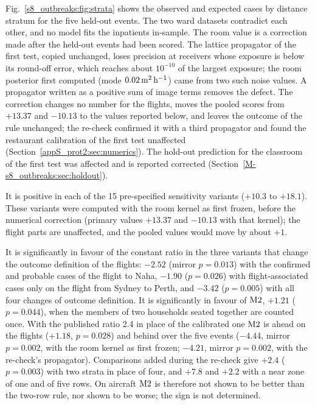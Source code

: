 Fig.~\ref{s8_outbreaks:fig:strata} shows the observed and expected cases by distance stratum for the five
held-out events. The two ward datasets contradict each other, and no model fits the inpatients in-sample.
The room value is a correction made after the held-out events had been scored. The lattice propagator of the
first test, copied unchanged, loses precision at receivers whose exposure is below its round-off error,
which reaches about $10^{-10}$ of the largest exposure; the room posterior first computed (mode $0.02\,\mathrm{m}^2\,\mathrm{h}^{-1}$) came from two such noise values. A
propagator written as a positive sum of image terms removes the defect. The correction changes no number for
the flights, moves the pooled scores from $+13.37$ and $-10.13$ to the values reported below, and leaves the
outcome of the rule unchanged; the re-check confirmed it with a third propagator and found the
restaurant calibration of the first test unaffected (Section~\ref{appS_prot2:sec:numerics}). The hold-out
prediction for the classroom of the first test was affected and is reported corrected
(Section~\ref{M-s8_outbreaks:sec:holdout}).

It is positive in each of the 15 pre-specified
sensitivity variants ($+10.3$ to $+18.1$). These variants were computed with the room kernel as first frozen,
before the numerical correction (primary values $+13.37$ and $-10.13$ with that kernel); the flight parts are
unaffected, and the pooled values would move by about $+1$.

It is significantly in favour of the constant
ratio in the three variants that change the outcome definition of the flights: $-2.52$ (mirror $p=0.013$) with
the confirmed and probable cases of the flight to Naha, $-1.90$ ($p=0.026$) with flight-associated cases only on
the flight from Sydney to Perth, and $-3.42$ ($p=0.005$) with all four changes of outcome definition. It is
significantly in favour of $\mathrm{M2}$, $+1.21$ ($p=0.044$), when the members of two households seated together are
counted once. With the published ratio 2.4 \citep{hertzberg2016risk} in place of the calibrated one $\mathrm{M2}$ is
ahead on the flights ($+1.18$, $p=0.028$) and behind over the five events ($-4.44$, mirror $p=0.002$, with
the room kernel as first frozen; $-4.21$, mirror $p=0.002$, with the re-check's propagator). Comparisons
added during the re-check give $+2.4$ ($p=0.003$) with two strata in place of four, and $+7.8$ and $+2.2$ with a
near zone of one and of five rows. On aircraft $\mathrm{M2}$ is therefore not shown to be better than the two-row rule, nor shown
to be worse; the sign is not determined.

